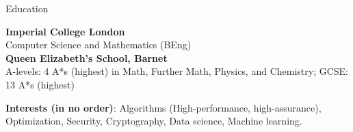 \documentclass[10pt]{resume} %
\begin{document}

\begin{rSection}{Education}

{\bf Imperial College London} \hfill \\
Computer Science and Mathematics (BEng)\\

{\bf Queen Elizabeth's School, Barnet} \\
A-levels: 4 A*s (highest) in Math, Further Math, Physics, and Chemistry;
GCSE: 13 A*s (highest)


\textbf{Interests (in no order)}:
  Algorithms (High-performance, high-assurance),
  Optimization,
  Security,
  Cryptography,
  Data science,
  Machine learning.


\end{rSection}

\end{document}
